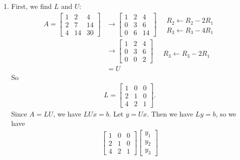 \documentclass[12pt,letterpaper]{article}
\begin{document}
\begin{enumerate}
  \item First, we find $L$ and $U$:
    \begin{align*}
      A =
      \begin{bmatrix}
        1 & 2 & 4 \\
        2 & 7 & 14 \\
        4 & 14 & 30
      \end{bmatrix}
      &\rightarrow
      \begin{bmatrix}
        1 & 2 & 4 \\
        0 & 3 & 6 \\
        0 & 6 & 14
      \end{bmatrix}
      \quad
      \begin{matrix}
        \\
        R_2 \leftarrow R_2 - 2R_1 \\
        R_3 \leftarrow R_3 - 4R_1
      \end{matrix} \\
      &\rightarrow
      \begin{bmatrix}
        1 & 2 & 4 \\
        0 & 3 & 6 \\
        0 & 0 & 2
      \end{bmatrix}
      \quad
      \begin{matrix}
        \\
        \\
        R_3 \leftarrow R_3 - 2R_1
      \end{matrix} \\
      &= U
    \end{align*}
    So
    \begin{align*}
      L =
      \begin{bmatrix}
        1 & 0 & 0 \\
        2 & 1 & 0 \\
        4 & 2 & 1
      \end{bmatrix}.
    \end{align*}
    Since $A=LU$, we have $LUx=b$. Let $y=Ux$. Then we have $Ly=b$, so we have
    \begin{align*}
      \begin{bmatrix}
        1 & 0 & 0 \\
        2 & 1 & 0 \\
        4 & 2 & 1
      \end{bmatrix}
      \begin{bmatrix}
        y_1 \\ y_2 \\ y_3

\end{bmatrix}
\end{align*}
\end{enumerate}
\end{document}
